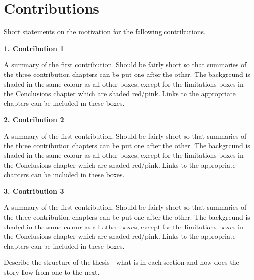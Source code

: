 \section{Contributions}

Short statements on the motivation for the following contributions.

\begin{shaded*}
\textbf{1. Contribution 1}

A summary of the first contribution. Should be fairly short so that summaries of the three contribution chapters can be put one after the other. The background is shaded in the same colour as all other boxes, except for the limitations boxes in the Conclusions chapter which are shaded red/pink. Links to the appropriate chapters can be included in these boxes.
\end{shaded*}

\begin{shaded*}
\textbf{2. Contribution 2}

A summary of the first contribution. Should be fairly short so that summaries of the three contribution chapters can be put one after the other. The background is shaded in the same colour as all other boxes, except for the limitations boxes in the Conclusions chapter which are shaded red/pink. Links to the appropriate chapters can be included in these boxes.
\end{shaded*}

\begin{shaded*}
\textbf{3. Contribution 3}

A summary of the first contribution. Should be fairly short so that summaries of the three contribution chapters can be put one after the other. The background is shaded in the same colour as all other boxes, except for the limitations boxes in the Conclusions chapter which are shaded red/pink. Links to the appropriate chapters can be included in these boxes.
\end{shaded*}

Describe the structure of the thesis - what is in each section and how does the story flow from one to the next.

